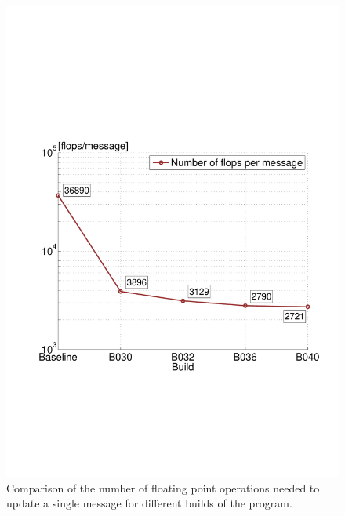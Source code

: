 \begin{figure}\centering
    \includegraphics[scale=0.47, trim={1.9cm 6.5cm 1.1cm 8.5cm},clip]{graphics/flops_per_message.pdf}
  \caption{Comparison of the number of floating point operations needed to update a single message for different builds of the program.\label{flops-per-message}}
\end{figure}

